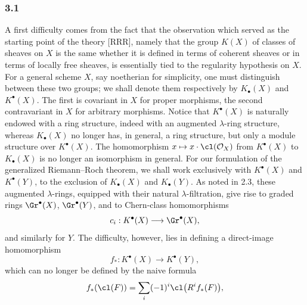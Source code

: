\subsubsection*{3.1}
A first difficulty comes from the fact that the observation which served as the starting point of the theory [RRR], namely that the group $K(X)$ of classes of sheaves on $X$ is the same whether it is defined in terms of coherent sheaves or in terms of locally free sheaves, is essentially tied to the regularity hypothesis on $X$. For a general scheme $X$, say noetherian for simplicity, one must distinguish between these two groups; we shall denote them respectively by $K_\bullet(X)$ and $K^\bullet(X)$. The first is covariant in $X$ for proper morphisms, the second contravariant in $X$ for arbitrary morphisms. Notice that $K^\bullet(X)$ is naturally endowed with a ring structure, indeed with an augmented $\lambda$-ring structure, whereas $K_\bullet(X)$ no longer has, in general, a ring structure, but only a module structure over $K^\bullet(X)$. The homomorphism $x\mapsto x\cdot\cl(\mathcal O_X)$ from $K^\bullet(X)$ to $K_\bullet(X)$ is no longer an isomorphism in general. For our formulation of the generalized Riemann--Roch theorem, we shall work exclusively with $K^\bullet(X)$ and $K^\bullet(Y)$, to the exclusion of $K_\bullet(X)$ and $K_\bullet(Y)$. As noted in 2.3, these augmented $\lambda$-rings, equipped with their natural $\lambda$-filtration, give rise to graded rings $\Gr^\bullet(X)$, $\Gr^\bullet(Y)$, and to Chern-class homomorphisms
\[
c_i:K^\bullet(X)\longrightarrow \Gr^\bullet(X),
\]
and similarly for $Y$. The difficulty, however, lies in defining a direct-image homomorphism
\begin{equation}\tag{3.1}
f_*:K^\bullet(X)\longrightarrow K^\bullet(Y),
\end{equation}
which can no longer be defined by the naive formula
\[
f_*(\cl(F))=\sum_i(-1)^i\cl\bigl(R^if_*(F)\bigr),
\]
